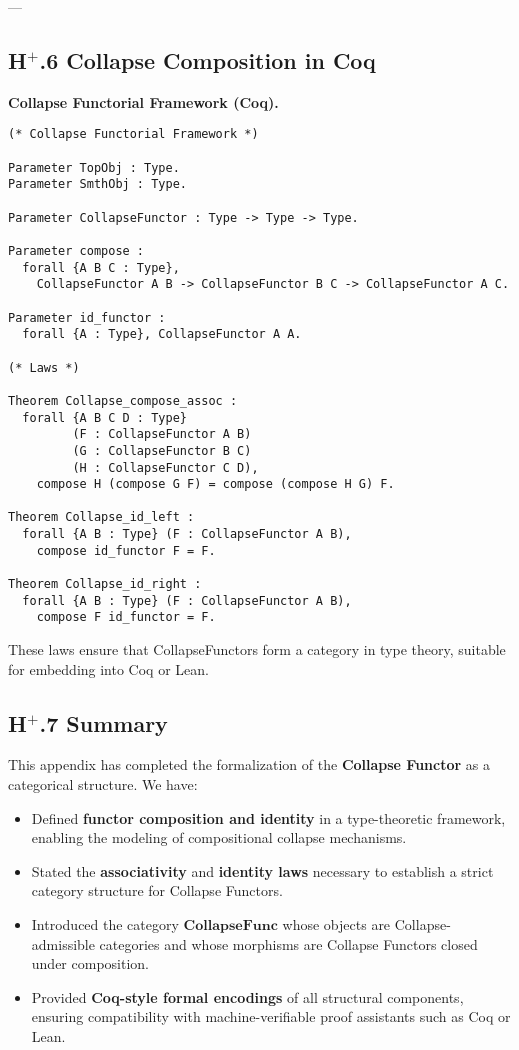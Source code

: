 \documentclass[11pt]{article}
\begin{document}
---

\subsection*{H$^{+}$.6 Collapse Composition in Coq}

\textbf{Collapse Functorial Framework (Coq).}
\vspace{0.5em}

\begin{lstlisting}[language=Coq, mathescape=false]
(* Collapse Functorial Framework *)

Parameter TopObj : Type.
Parameter SmthObj : Type.

Parameter CollapseFunctor : Type -> Type -> Type.

Parameter compose :
  forall {A B C : Type},
    CollapseFunctor A B -> CollapseFunctor B C -> CollapseFunctor A C.

Parameter id_functor :
  forall {A : Type}, CollapseFunctor A A.

(* Laws *)

Theorem Collapse_compose_assoc :
  forall {A B C D : Type}
         (F : CollapseFunctor A B)
         (G : CollapseFunctor B C)
         (H : CollapseFunctor C D),
    compose H (compose G F) = compose (compose H G) F.

Theorem Collapse_id_left :
  forall {A B : Type} (F : CollapseFunctor A B),
    compose id_functor F = F.

Theorem Collapse_id_right :
  forall {A B : Type} (F : CollapseFunctor A B),
    compose F id_functor = F.
\end{lstlisting}

These laws ensure that CollapseFunctors form a category in type theory, suitable for embedding into Coq or Lean.

\subsection*{H$^{+}$.7 Summary}

This appendix has completed the formalization of the \textbf{Collapse Functor} as a categorical structure.  
We have:

\begin{itemize}
  \item Defined \textbf{functor composition and identity} in a type-theoretic framework, enabling the modeling of compositional collapse mechanisms.
  
  \item Stated the \textbf{associativity} and \textbf{identity laws} necessary to establish a strict category structure for Collapse Functors.
  
  \item Introduced the category $\mathbf{CollapseFunc}$ whose objects are Collapse-admissible categories and whose morphisms are Collapse Functors closed under composition.
  
  \item Provided \textbf{Coq-style formal encodings} of all structural components, ensuring compatibility with machine-verifiable proof assistants such as Coq or Lean.
\end{itemize}
\end{document}
